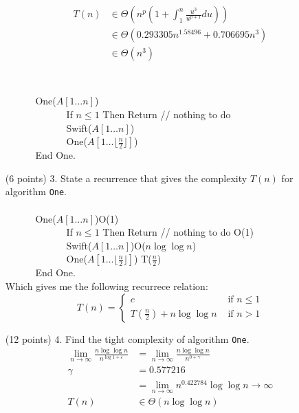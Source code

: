 \documentclass[paper=a4,fontsize=11pt]{article}
\begin{document}
\begin{enumerate}
\begin{align*}
    T(n) &\in \Theta(n^{p}(1+\int_{1}^{n}{\frac{u^{3}}{u^{p+1}}du}))\\
    &\in \Theta(0.293305 n^{1.58496}+0.706695 n^{3})\\
    &\in \Theta(n^{3})\\
\end{align*}\\
{\ttfamily
$\phantom{A}$\\
$\phantom{---}$ One($A[1\dots n]$)\\
$\phantom{--- ---}$ If $n \leq 1$ Then Return // nothing to do\\
$\phantom{--- ---}$ Swift($A[1\dots n]$)\\
$\phantom{--- ---}$ One($A[1\dots\lfloor\frac{n}{2}\rfloor]$)\\
$\phantom{---}$ End One.
}\\
\item [(6 points) 3.] State a recurrence that gives the complexity $T(n)$ for algorithm \texttt{One}.\\
{\ttfamily
$\phantom{A}$\\
$\phantom{---}$ One($A[1\dots n]$)O(1)\\
$\phantom{--- ---}$ If $n \leq 1$ Then Return // nothing to do O(1)\\
$\phantom{--- ---}$ Swift($A[1\dots n]$)O($n\log{\log{n}}$)\\
$\phantom{--- ---}$ One($A[1\dots\lfloor\frac{n}{2}\rfloor]$) T($\frac{n}{2}$)\\
$\phantom{---}$ End One.
}\\
Which gives me the following recurrece relation:\\
\[
T(n) = \left\{
\begin{array}{cl}
c & \textrm{ if } n \leq 1\\
T(\frac{n}{2}) + n\log{\log{n}} & \textrm{ if } n > 1
\end{array}
\right.
\]
\item [(12 points) 4.] Find the tight complexity of algorithm \texttt{One}.\\
\begin{align*}
    \lim_{n\to\infty}{\frac{n\log{\log{n}}}{n^{\log{1}+\varepsilon}}}&=\lim_{n\to\infty}{\frac{n\log{\log{n}}}{n^{0+\gamma}}}\\
    \gamma&=0.577216\\
    &=\lim_{n\to\infty}{n^{0.422784}\log{\log{n}}}\rightarrow\infty\\
    T(n)&\in \Theta(n\log{\log{n}})\\
\end{align*}

\end{enumerate}
\end{document}
